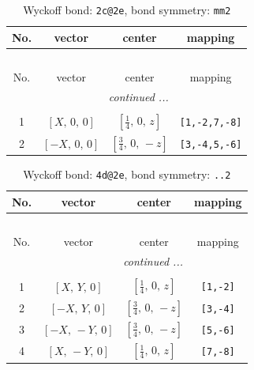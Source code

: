 \documentclass[fleqn,8pt]{jsarticle}
\begin{document}
\begin{longtable}{cccc}
\caption{Wyckoff bond: {\tt 2c@2e}, bond symmetry: {\tt mm2}}
 \\
 \hline \hline
No. & vector & center & mapping \\ \hline \endfirsthead

\multicolumn{3}{l}{\tablename\ \thetable{}} \\
 \hline \hline
No. & vector & center & mapping \\ \hline \endhead

 \hline \hline
\multicolumn{3}{r}{\footnotesize\it continued ...} \\ \endfoot

 \hline \hline
\multicolumn{3}{r}{} \\ \endlastfoot

1 & $\left[ X,\, 0,\, 0 \right]$ & $\left[ \frac{1}{4},\, 0,\, z \right]$ & {\tt [1,-2,7,-8]} \\ \hline
2 & $\left[ - X,\, 0,\, 0 \right]$ & $\left[ \frac{3}{4},\, 0,\, - z \right]$ & {\tt [3,-4,5,-6]} \\
\end{longtable}
\renewcommand{\arraystretch}{1.2}
\begin{longtable}{cccc}
\caption{Wyckoff bond: {\tt 4d@2e}, bond symmetry: {\tt ..2}}
 \\
 \hline \hline
No. & vector & center & mapping \\ \hline \endfirsthead

\multicolumn{3}{l}{\tablename\ \thetable{}} \\
 \hline \hline
No. & vector & center & mapping \\ \hline \endhead

 \hline \hline
\multicolumn{3}{r}{\footnotesize\it continued ...} \\ \endfoot

 \hline \hline
\multicolumn{3}{r}{} \\ \endlastfoot

1 & $\left[ X,\, Y,\, 0 \right]$ & $\left[ \frac{1}{4},\, 0,\, z \right]$ & {\tt [1,-2]} \\ \hline
2 & $\left[ - X,\, Y,\, 0 \right]$ & $\left[ \frac{3}{4},\, 0,\, - z \right]$ & {\tt [3,-4]} \\ \hline
3 & $\left[ - X,\, - Y,\, 0 \right]$ & $\left[ \frac{3}{4},\, 0,\, - z \right]$ & {\tt [5,-6]} \\ \hline
4 & $\left[ X,\, - Y,\, 0 \right]$ & $\left[ \frac{1}{4},\, 0,\, z \right]$ & {\tt [7,-8]} \\
\end{longtable}
\end{document}
